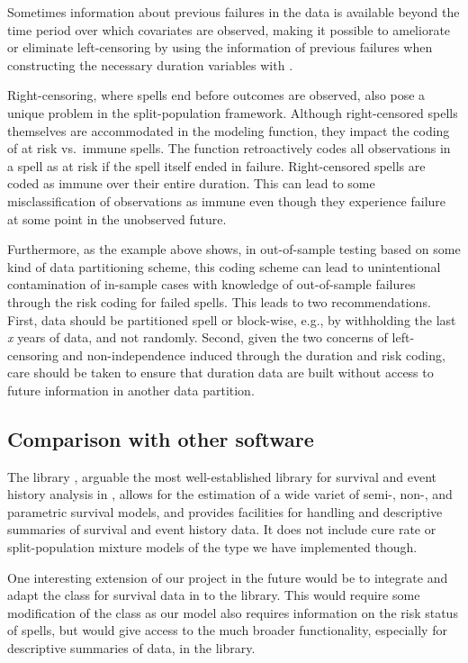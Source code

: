\documentclass[article]{jss}
\begin{document}
Sometimes information about previous failures in the data is available
beyond the time period over which covariates are observed, making it
possible to ameliorate or eliminate left-censoring by using the
information of previous failures when constructing the necessary
duration variables with .

Right-censoring, where spells end before outcomes are observed, also
pose a unique problem in the split-population framework. Although
right-censored spells themselves are accommodated in the modeling
function, they impact the coding of at risk vs.~immune spells. The
 function retroactively codes all observations in
a spell as at risk if the spell itself ended in failure. Right-censored
spells are coded as immune over their entire duration. This can lead to
some misclassification of observations as immune even though they
experience failure at some point in the unobserved future.

Furthermore, as the example above shows, in out-of-sample testing based
on some kind of data partitioning scheme, this coding scheme can lead to
unintentional contamination of in-sample cases with knowledge of
out-of-sample failures through the risk coding for failed spells. This
leads to two recommendations. First, data should be partitioned spell or
block-wise, e.g., by withholding the last \emph{x} years of data, and
not randomly. Second, given the two concerns of left-censoring and
non-independence induced through the duration and risk coding, care
should be taken to ensure that duration data are built without access to
future information in another data partition.

\subsection{Comparison with other software}

The  library \citep{thernau2000modeling, thernau2015survival}, arguable the most well-established library for survival and event history analysis in , allows for the estimation of a wide variet of semi-, non-, and parametric survival models, and provides facilities for handling and descriptive summaries of survival and event history data. It does not include cure rate or split-population mixture models of the type we have implemented though.

One interesting extension of our project in the future would be to integrate and adapt the  class for survival data in  to the  library. This would require some modification of the class as our model also requires information on the risk status of spells, but would give access to the much broader functionality, especially for descriptive summaries of data, in the  library. 
\end{document}
